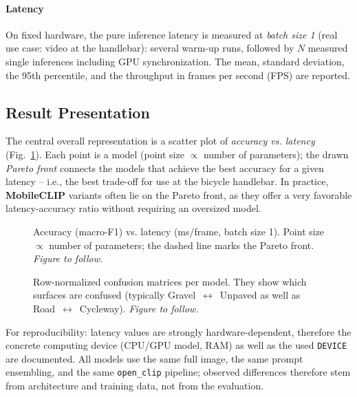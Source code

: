 \documentclass[letterpaper,journal]{IEEEtran}
\begin{document}
\paragraph{Latency} On fixed hardware, the pure inference latency is
measured at \emph{batch size 1} (real use case: video at the handlebar):
several warm-up runs, followed by $N$ measured single inferences
including GPU synchronization. The mean, standard deviation, the 95th
percentile, and the throughput in frames per second (FPS) are reported.

\subsection{Result Presentation}
The central overall representation is a scatter plot of
\emph{accuracy vs. latency} (Fig.~\ref{fig:pareto}). Each point is a
model (point size $\propto$ number of parameters); the drawn
\emph{Pareto front} connects the models that achieve the best accuracy
for a given latency -- i.e., the best trade-off for use at the bicycle
handlebar. In practice, \textbf{MobileCLIP} variants often lie on the
Pareto front, as they offer a very favorable latency-accuracy ratio
without requiring an oversized model.

\begin{figure}[!t]
\centering
\caption{Accuracy (macro-F1) vs. latency (ms/frame, batch size 1).
Point size $\propto$ number of parameters; the dashed line marks the
Pareto front. \emph{Figure to follow.}}
\label{fig:pareto}
\end{figure}

\begin{figure}[!t]
\centering
\caption{Row-normalized confusion matrices per model. They show which
surfaces are confused (typically Gravel~$\leftrightarrow$~Unpaved as
well as Road~$\leftrightarrow$~Cycleway). \emph{Figure to follow.}}
\label{fig:confusion}
\end{figure}

For reproducibility: latency values are strongly hardware-dependent,
therefore the concrete computing device (CPU/GPU model, RAM) as well as
the used \texttt{DEVICE} are documented. All models use the same full
image, the same prompt ensembling, and the same \texttt{open\_clip}
pipeline; observed differences therefore stem from architecture and
training data, not from the evaluation.
\end{document}
